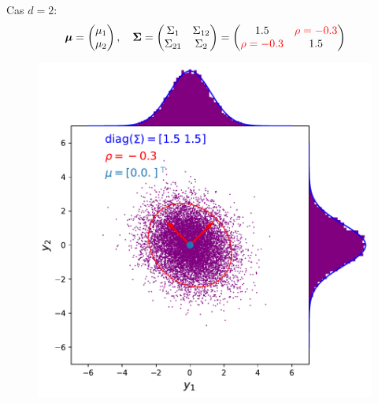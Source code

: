 \documentclass[xcolor=svgnames, t]{beamer}
\newcommand{\vectorx}[1]{\boldsymbol{\MakeLowercase{\mathbf{#1}}}}
\newcommand{\matrixx}[1]{\boldsymbol{\MakeUppercase{#1}}}
\begin{document}
\begin{frame}
  Cas $d=2$:
  \begin{equation*}
    \vectorx{\mu}
    =
    \begin{pmatrix}
      \mu_1 \\
      \mu_2
    \end{pmatrix},
    \quad
    \matrixx{\Sigma}
    =
      \begin{pmatrix}
        \Sigma_{1} & \Sigma_{12} \\
        \Sigma_{21} & \Sigma_{2}
      \end{pmatrix}
    =
      \begin{pmatrix}
        1.5 & \color{red}\rho = -0.3 \\
        \color{red}\rho = -0.3 & 1.5
      \end{pmatrix}
  \end{equation*}
% 
  \begin{figure}
    \includegraphics[scale=0.4]{gaussian_2d_rho_low.pdf}
  \end{figure}
\end{frame}
\end{document}
